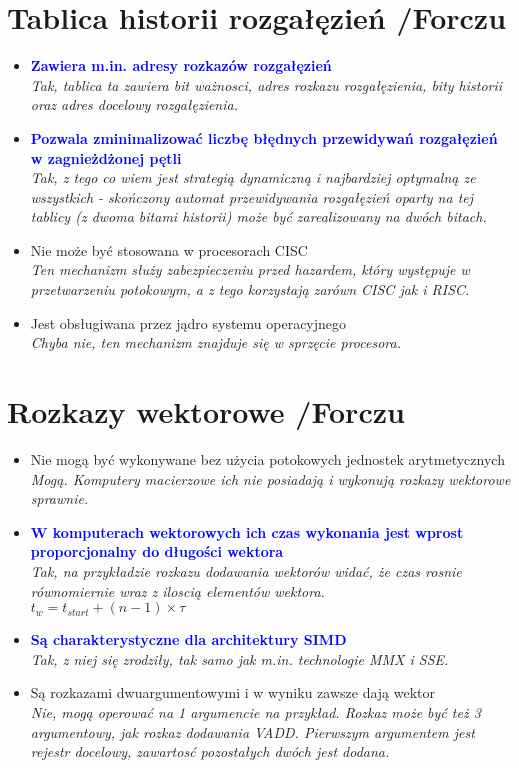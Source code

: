 \section{Tablica historii rozgałęzień {\small /Forczu}}
	\begin{itemize}
    \item \textcolor{Blue}{\textbf{Zawiera m.in. adresy rozkazów rozgałęzień}}\\
    {\small \emph{Tak, tablica ta zawiera bit ważnosci, \emph{adres rozkazu rozgałęzienia}, bity historii oraz \emph{adres docelowy rozgałęzienia}.}}
    \item \textcolor{Blue}{\textbf{Pozwala zminimalizować liczbę błędnych przewidywań rozgałęzień w zagnieżdżonej pętli}}\\
    {\small \emph{Tak, z tego co wiem jest strategią dynamiczną i najbardziej optymalną ze wszystkich - skończony automat przewidywania rozgałęzień oparty na tej tablicy (z dwoma bitami historii) może być zarealizowany na dwóch bitach.}}
    \item Nie może być stosowana w procesorach CISC\\
    {\small \emph{Ten mechanizm służy zabezpieczeniu przed hazardem, który występuje w przetwarzeniu potokowym, a z tego korzystają zarówn CISC jak i RISC.}}
    \item Jest obsługiwana przez jądro systemu operacyjnego\\
    {\small \emph{Chyba nie, ten mechanizm znajduje się w sprzęcie procesora.}}
    \end{itemize}

\section{Rozkazy wektorowe {\small /Forczu}}
	\begin{itemize}
    \item Nie mogą być wykonywane bez użycia potokowych jednostek arytmetycznych\\
    {\small \emph{Mogą. Komputery macierzowe ich nie posiadają i wykonują rozkazy wektorowe sprawnie.}}
    \item \textcolor{Blue}{\textbf{W komputerach wektorowych ich czas wykonania jest wprost proporcjonalny do długości wektora}}\\
    {\small \emph{Tak, na przykładzie rozkazu dodawania wektorów widać, że czas rosnie równomiernie wraz z iloscią elementów wektora.\\
    $t_{w}=t_{start}+(n-1)\times\tau$}}
    \item \textcolor{Blue}{\textbf{Są charakterystyczne dla architektury SIMD}}\\
    {\small \emph{Tak, z niej się zrodziły, tak samo jak m.in. technologie MMX i SSE.}}
    \item Są rozkazami dwuargumentowymi i w wyniku zawsze dają wektor\\
    {\small \emph{Nie, mogą operować na 1 argumencie na przykład. Rozkaz może być też 3 argumentowy, jak rozkaz dodawania VADD. Pierwszym argumentem jest rejestr docelowy, zawartosć pozostałych dwóch jest dodana.}}
    \end{itemize}

